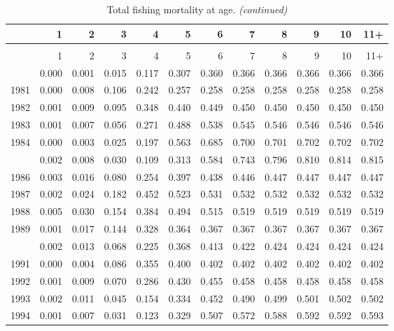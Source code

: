 \documentclass[
]{article}
\begin{document}
\begin{longtable}[t]{lrrrrrrrrrrr}
\caption{\label{tab:FAA-tot-table}Total fishing mortality at age.}\\
\toprule
  & 1 & 2 & 3 & 4 & 5 & 6 & 7 & 8 & 9 & 10 & 11+\\
\midrule
\endfirsthead
\caption[]{Total fishing mortality at age. \textit{(continued)}}\\
\toprule
  & 1 & 2 & 3 & 4 & 5 & 6 & 7 & 8 & 9 & 10 & 11+\\
\midrule
\endhead

\endfoot
\bottomrule
\endlastfoot
1980 & 0.000 & 0.001 & 0.015 & 0.117 & 0.307 & 0.360 & 0.366 & 0.366 & 0.366 & 0.366 & 0.366\\
1981 & 0.000 & 0.008 & 0.106 & 0.242 & 0.257 & 0.258 & 0.258 & 0.258 & 0.258 & 0.258 & 0.258\\
1982 & 0.001 & 0.009 & 0.095 & 0.348 & 0.440 & 0.449 & 0.450 & 0.450 & 0.450 & 0.450 & 0.450\\
1983 & 0.001 & 0.007 & 0.056 & 0.271 & 0.488 & 0.538 & 0.545 & 0.546 & 0.546 & 0.546 & 0.546\\
1984 & 0.000 & 0.003 & 0.025 & 0.197 & 0.563 & 0.685 & 0.700 & 0.701 & 0.702 & 0.702 & 0.702\\
\addlinespace
1985 & 0.002 & 0.008 & 0.030 & 0.109 & 0.313 & 0.584 & 0.743 & 0.796 & 0.810 & 0.814 & 0.815\\
1986 & 0.003 & 0.016 & 0.080 & 0.254 & 0.397 & 0.438 & 0.446 & 0.447 & 0.447 & 0.447 & 0.447\\
1987 & 0.002 & 0.024 & 0.182 & 0.452 & 0.523 & 0.531 & 0.532 & 0.532 & 0.532 & 0.532 & 0.532\\
1988 & 0.005 & 0.030 & 0.154 & 0.384 & 0.494 & 0.515 & 0.519 & 0.519 & 0.519 & 0.519 & 0.519\\
1989 & 0.001 & 0.017 & 0.144 & 0.328 & 0.364 & 0.367 & 0.367 & 0.367 & 0.367 & 0.367 & 0.367\\
\addlinespace
1990 & 0.002 & 0.013 & 0.068 & 0.225 & 0.368 & 0.413 & 0.422 & 0.424 & 0.424 & 0.424 & 0.424\\
1991 & 0.000 & 0.004 & 0.086 & 0.355 & 0.400 & 0.402 & 0.402 & 0.402 & 0.402 & 0.402 & 0.402\\
1992 & 0.001 & 0.009 & 0.070 & 0.286 & 0.430 & 0.455 & 0.458 & 0.458 & 0.458 & 0.458 & 0.458\\
1993 & 0.002 & 0.011 & 0.045 & 0.154 & 0.334 & 0.452 & 0.490 & 0.499 & 0.501 & 0.502 & 0.502\\
1994 & 0.001 & 0.007 & 0.031 & 0.123 & 0.329 & 0.507 & 0.572 & 0.588 & 0.592 & 0.592 & 0.593\\

\end{longtable}
\end{document}
